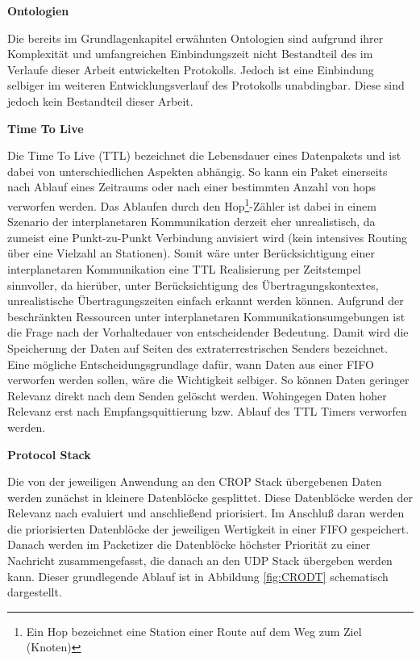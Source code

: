 \label{sec:Vorueberlegung}

\textbf{Ontologien}

Die bereits im Grundlagenkapitel erw{\"a}hnten Ontologien sind aufgrund ihrer
Komplexit{\"a}t und umfangreichen Einbindungszeit nicht Bestandteil des im
Verlaufe dieser Arbeit entwickelten Protokolls. Jedoch ist eine Einbindung
selbiger im weiteren Entwicklungsverlauf des Protokolls unabdingbar. Diese sind
jedoch kein Bestandteil dieser Arbeit.

\textbf{Time To Live}

Die Time To Live (TTL) bezeichnet die Lebensdauer eines Datenpakets und ist
dabei von unterschiedlichen Aspekten abh{\"a}ngig. So kann ein Paket einerseits nach
Ablauf eines Zeitraums oder nach einer bestimmten Anzahl
von hops verworfen werden. Das Ablaufen durch den Hop\footnote{Ein Hop
bezeichnet eine Station einer Route auf dem Weg zum Ziel (Knoten)}-Zähler
ist dabei in einem Szenario der interplanetaren Kommunikation derzeit eher
unrealistisch, da zumeist eine Punkt-zu-Punkt Verbindung anvisiert wird (kein
intensives Routing {\"u}ber eine Vielzahl an Stationen). Somit w{\"a}re unter
Ber{\"u}cksichtigung einer interplanetaren Kommunikation eine TTL Realisierung
per Zeitstempel sinnvoller, da hier{\"u}ber, unter Ber{\"u}cksichtigung des
{\"U}bertragungskontextes, unrealistische {\"U}bertragungszeiten einfach erkannt
werden k{\"o}nnen.
Aufgrund der beschr{\"a}nkten Ressourcen unter interplanetaren
Kommunikationsumgebungen ist die Frage nach der Vorhaltedauer von
entscheidender Bedeutung. Damit wird die Speicherung der
Daten auf Seiten des extraterrestrischen Senders bezeichnet. 
Eine m{\"o}gliche Entscheidungsgrundlage daf{\"u}r, wann Daten aus einer
FIFO verworfen werden sollen, w{\"a}re die Wichtigkeit selbiger. So
k{\"o}nnen Daten geringer Relevanz direkt nach dem Senden gel{\"o}scht werden.
Wohingegen Daten hoher Relevanz erst nach Empfangsquittierung bzw. Ablauf des
TTL Timers verworfen werden.

\textbf{Protocol Stack} \label{sec:Konzept_Protocolstack}

Die von der jeweiligen Anwendung an den CROP Stack {\"u}bergebenen Daten werden
zun{\"a}chst in kleinere Datenbl{\"o}cke gesplittet. Diese Datenbl{\"o}cke
werden der Relevanz nach evaluiert und anschlie{\ss}end priorisiert.
Im Anschlu{\ss} daran werden die priorisierten Datenbl{\"o}cke der jeweiligen
Wertigkeit in einer FIFO gespeichert. Danach werden im
Packetizer die Datenbl{\"o}cke h{\"o}chster Priorit{\"a}t zu einer
Nachricht zusammengefasst, die danach an den UDP Stack {\"u}bergeben werden
kann. Dieser grundlegende Ablauf ist in Abbildung \ref{fig:CRODT} schematisch
dargestellt.

